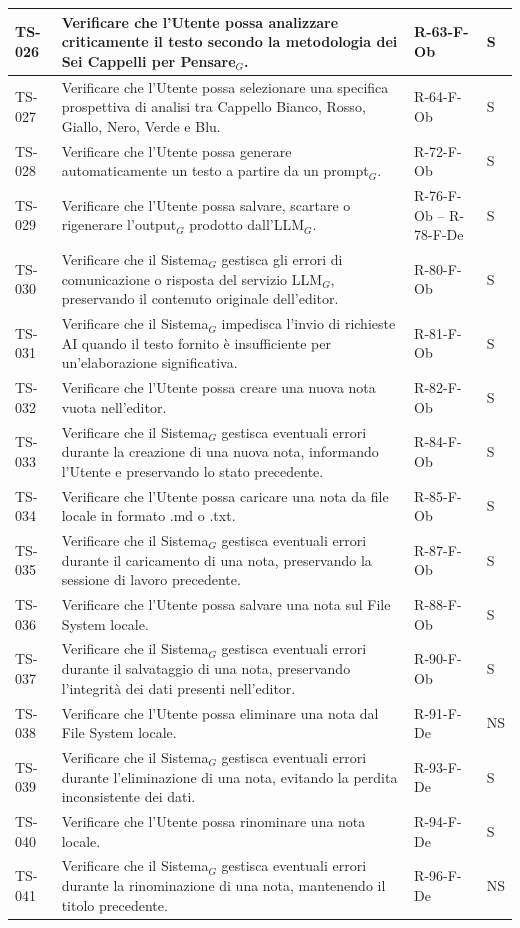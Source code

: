 \documentclass[a4paper, 10pt, colorlinks=true, linkcolor=black, urlcolor=blue, citecolor=blue, hidelinks]{article}
\begin{document}
\begin{longtable}{|p{1.4cm}|p{7.8cm}|p{2.3cm}|p{1.2cm}|}
    TS-026 & Verificare che l'Utente possa analizzare criticamente il testo secondo la metodologia dei Sei Cappelli per Pensare$_G$. & R-63-F-Ob & S \\
    \hline
    TS-027 & Verificare che l'Utente possa selezionare una specifica prospettiva di analisi tra Cappello Bianco, Rosso, Giallo, Nero, Verde e Blu. & R-64-F-Ob & S \\
    \hline
    TS-028 & Verificare che l'Utente possa generare automaticamente un testo a partire da un prompt$_G$. & R-72-F-Ob & S \\
    \hline
    TS-029 & Verificare che l'Utente possa salvare, scartare o rigenerare l'output$_G$ prodotto dall'LLM$_G$. & R-76-F-Ob -- R-78-F-De & S \\
    \hline
    TS-030 & Verificare che il Sistema$_G$ gestisca gli errori di comunicazione o risposta del servizio LLM$_G$, preservando il contenuto originale dell'editor. & R-80-F-Ob & S \\
    \hline
    TS-031 & Verificare che il Sistema$_G$ impedisca l'invio di richieste AI quando il testo fornito è insufficiente per un'elaborazione significativa. & R-81-F-Ob & S \\
    \hline
    TS-032 & Verificare che l'Utente possa creare una nuova nota vuota nell'editor. & R-82-F-Ob & S \\
    \hline
    TS-033 & Verificare che il Sistema$_G$ gestisca eventuali errori durante la creazione di una nuova nota, informando l'Utente e preservando lo stato precedente. & R-84-F-Ob & S \\
    \hline
    TS-034 & Verificare che l'Utente possa caricare una nota da file locale in formato .md o .txt. & R-85-F-Ob & S \\
    \hline
    TS-035 & Verificare che il Sistema$_G$ gestisca eventuali errori durante il caricamento di una nota, preservando la sessione di lavoro precedente. & R-87-F-Ob & S \\
    \hline
    TS-036 & Verificare che l'Utente possa salvare una nota sul File System locale. & R-88-F-Ob & S \\
    \hline
    TS-037 & Verificare che il Sistema$_G$ gestisca eventuali errori durante il salvataggio di una nota, preservando l'integrità dei dati presenti nell'editor. & R-90-F-Ob & S \\
    \hline
    TS-038 & Verificare che l'Utente possa eliminare una nota dal File System locale. & R-91-F-De & NS \\
    \hline
    TS-039 & Verificare che il Sistema$_G$ gestisca eventuali errori durante l'eliminazione di una nota, evitando la perdita inconsistente dei dati. & R-93-F-De & S \\
    \hline
    TS-040 & Verificare che l'Utente possa rinominare una nota locale. & R-94-F-De & S \\
    \hline
    TS-041 & Verificare che il Sistema$_G$ gestisca eventuali errori durante la rinominazione di una nota, mantenendo il titolo precedente. & R-96-F-De & NS \\
    \hline


\end{longtable}
\end{document}
